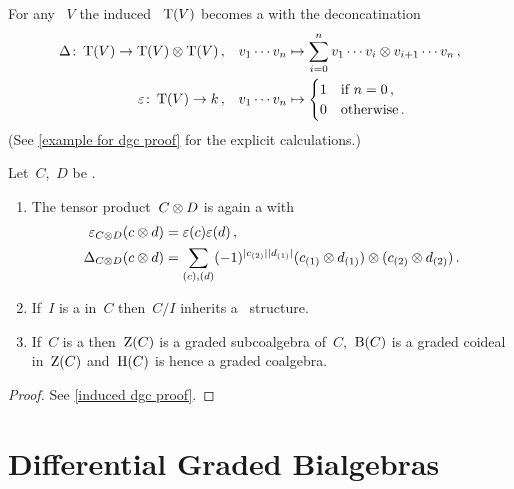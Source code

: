 \documentclass[a4paper,10pt,headings=standardclasses]{scrartcl}
\begin{document}
\begin{example}
  \label{example for dgc}
  For any {\dgv}~$V$ the induced {\dgv}~$\operatorname{T}(V)$ becomes a {\dgc} with the deconcatination
  \begin{align*}
    \Delta
    \colon
    \operatorname{T}(V)
    \to
    \operatorname{T}(V) \otimes \operatorname{T}(V) \,,
    \quad
    &v_1 \dotsm v_n
    \mapsto
    \sum_{i=0}^n
    v_1 \dotsm v_i \otimes v_{i+1} \dotsm v_n \,,
  \\
    \varepsilon
    \colon
    \operatorname{T}(V)
    \to
    k \,,
    \quad
    &v_1 \dotsm v_n
    \mapsto
    \begin{cases}
      1 & \text{if~$n = 0$} \,, \\
      0 & \text{otherwise} \,.
    \end{cases}
  \end{align*}
  (See \cref{example for dgc proof} for the explicit calculations.)
\end{example}

\begin{proposition}
  \label{induced dgc}
  Let~$C$,~$D$ be {\dgcs}.
  \begin{enumerate}
    \item
      The tensor product~$C \otimes D$ is again a {\dgc} with
      \begin{align*}
        \varepsilon_{C \otimes D}(c \otimes d)
        &=
        \varepsilon(c) \varepsilon(d) \,,
      \\
        \Delta_{C \otimes D}(c \otimes d)
        &=
        \sum_{(c), (d)}
        (-1)^{\lvert c_{(2)}\rvert \lvert d_{(1)}\rvert}
        (c_{(1)} \otimes d_{(1)}) \otimes (c_{(2)} \otimes d_{(2)}) \,.
      \end{align*}
    \item
      If~$I$ is a {\dgci} in~$C$ then~$C/I$ inherits a~{\dgc} structure.
    \item
      If~$C$ is a {\dgc} then~$\operatorname{Z}(C)$ is a graded subcoalgebra of~$C$,~$\operatorname{B}(C)$ is a graded coideal in~$\operatorname{Z}(C)$ and~$\operatorname{H}(C)$ is hence a graded coalgebra.
  \end{enumerate}
\end{proposition}

\begin{proof}
  See \cref{induced dgc proof}.
\end{proof}





\section{Differential Graded Bialgebras}
\end{document}
